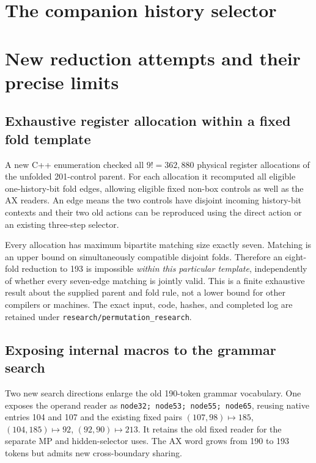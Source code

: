 \documentclass[11pt]{article}
\begin{document}


\section{The companion history selector}\label{sec:b-companion}




\section{New reduction attempts and their precise limits}
\subsection{Exhaustive register allocation within a fixed fold template}
A new C++ enumeration checked all $9!=362,880$ physical register allocations of the unfolded 201-control parent. For each allocation it recomputed all eligible one-history-bit fold edges, allowing eligible fixed non-box controls as well as the AX readers. An edge means the two controls have disjoint incoming history-bit contexts and their two old actions can be reproduced using the direct action or an existing three-step selector.

Every allocation has maximum bipartite matching size exactly seven. Matching is an upper bound on simultaneously compatible disjoint folds. Therefore an eight-fold reduction to 193 is impossible \emph{within this particular template}, independently of whether every seven-edge matching is jointly valid. This is a finite exhaustive result about the supplied parent and fold rule, not a lower bound for other compilers or machines. The exact input, code, hashes, and completed log are retained under \texttt{research/permutation\_research}.

\subsection{Exposing internal macros to the grammar search}
Two new search directions enlarge the old 190-token grammar vocabulary. One exposes the operand reader as \texttt{node32; node53; node55; node65}, reusing native entries 104 and 107 and the existing fixed pairs $(107,98)\mapsto185$, $(104,185)\mapsto92$, $(92,90)\mapsto213$. It retains the old fixed reader for the separate MP and hidden-selector uses. The AX word grows from 190 to 193 tokens but admits new cross-boundary sharing.
\end{document}
